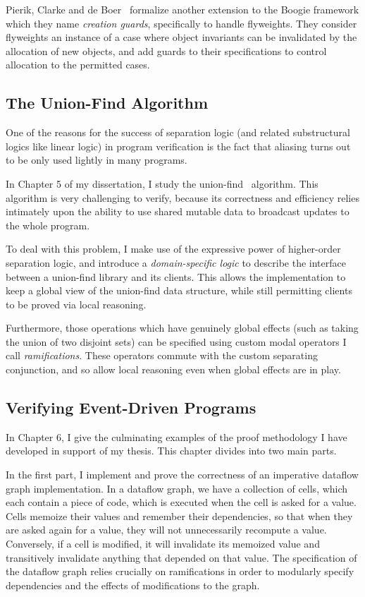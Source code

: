 Pierik, Clarke and de Boer~\cite{creational-invariants} formalize another
extension to the Boogie framework which they name \emph{creation
  guards}, specifically to handle flyweights. They consider flyweights
an instance of a case where object invariants can be invalidated by
the allocation of new objects, and add guards to their specifications
to control allocation to the permitted cases. 


\subsection{The Union-Find Algorithm}

One of the reasons for the success of separation logic (and related
substructural logics like linear logic) in program verification is the
fact that aliasing turns out to be only used lightly in many
programs. 

In Chapter 5 of my dissertation, I study the
union-find~\cite{union-find} algorithm. This algorithm is very
challenging to verify, because its correctness and efficiency relies
intimately upon the ability to use shared mutable data to broadcast
updates to the whole program.

To deal with this problem, I make use of the expressive power of
higher-order separation logic, and introduce a \emph{domain-specific
  logic} to describe the interface between a union-find library and
its clients. This allows the implementation to keep a global view of
the union-find data structure, while still permitting clients to be
proved via local reasoning.

Furthermore, those operations which have genuinely global effects
(such as taking the union of two disjoint sets) can be specified using
custom modal operators I call \emph{ramifications}. These operators
commute with the custom separating conjunction, and so allow local
reasoning even when global effects are in play.

\subsection{Verifying Event-Driven Programs}

In Chapter 6, I give the culminating examples of the proof methodology
I have developed in support of my thesis. This chapter divides into 
two main parts. 

In the first part, I implement and prove the correctness of an
imperative dataflow graph implementation. In a dataflow graph, we have
a collection of cells, which each contain a piece of code, which is
executed when the cell is asked for a value. Cells memoize their
values and remember their dependencies, so that when they are asked
again for a value, they will not unnecessarily recompute a
value. Conversely, if a cell is modified, it will invalidate its
memoized value and transitively invalidate anything that depended on
that value.  The specification of the dataflow graph relies crucially
on ramifications in order to modularly specify dependencies and the
effects of modifications to the graph.

